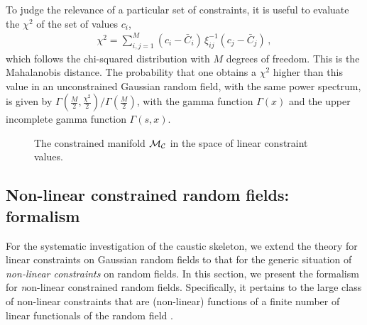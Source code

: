 \documentclass[a4paper, 11pt]{article}
\begin{document}
To judge the relevance of a particular set of constraints, it is useful to evaluate the $\chi^2$ of the set of values $c_i$,
\begin{align}
\chi^2 = \sum_{i,j=1}^M (c_i-\bar{C}_i)\, \xi_{ij}^{-1}(c_j-\bar{C}_j)\,,
\end{align}
which follows the chi-squared distribution with $M$ degrees of freedom. This is the Mahalanobis distance. The probability that one obtains a $\chi^2$ higher than this value in an unconstrained Gaussian random field, with the same power spectrum, is given by $\Gamma\left(\frac{M}{2}, \frac{\chi^2}{2}\right)/\Gamma\left(\frac{M}{2}\right)$, with the gamma function $\Gamma(x)$ and the upper incomplete gamma function $\Gamma(s,x)$.

\begin{figure}
\centering
\begin{subfigure}[b]{0.49\textwidth}
\end{subfigure}
\caption{The constrained manifold $\mathcal{M}_\mathcal{\cal C}$ in the space of linear constraint values.}\label{fig:constraintManifold}
\end{figure}


\bigskip
\subsection{Non-linear constrained random fields: formalism}
For the systematic investigation of the caustic skeleton, we extend the theory for linear constraints on Gaussian random fields to that for the generic situation of \textit{non-linear constraints} on random fields. In this section, we present the formalism for {\textit non-linear constrained random fields}. Specifically, it pertains to the large class of non-linear constraints that are (non-linear) functions of a finite number of linear functionals of the random field \citep{Bertschinger:1987,Hoffman:1991,Rybicki:1992,Weygaert:1996}.  
\end{document}
